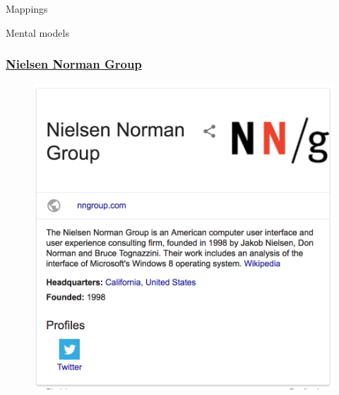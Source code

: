 \begin{frame}
	\begin{center}
		\huge Mappings
	\end{center}
\end{frame}

\begin{frame}
	\begin{center}
		\huge Mental models
	\end{center}
\end{frame}



\begin{frame}
	\frametitle{\href{https://www.nngroup.com/}{Nielsen Norman Group}}
	\begin{figure}
		\includegraphics[scale=.35]{assets/nngroup}
	\end{figure}
\end{frame}





